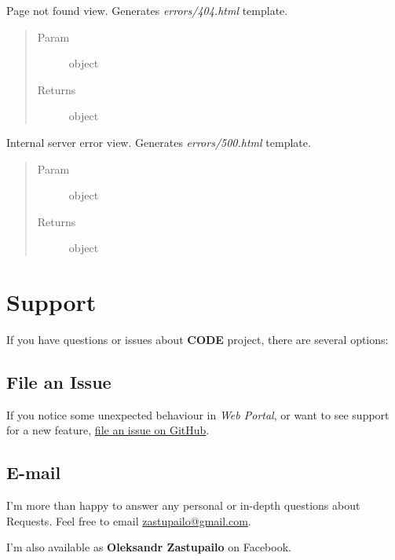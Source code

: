 \documentclass[letterpaper,10pt,english]{sphinxmanual}
\begin{document}
\begin{fulllineitems}
\label{web_portal:core.errors.views.page_not_found}
Page not found view. Generates \emph{errors/404.html} template.
\begin{quote}\begin{description}
\item[{Param}] \leavevmode
{} object

\item[{Returns}] \leavevmode
{} object

\end{description}\end{quote}

\end{fulllineitems}


\begin{fulllineitems}
\label{web_portal:core.errors.views.server_error}
Internal server error view. Generates \emph{errors/500.html} template.
\begin{quote}\begin{description}
\item[{Param}] \leavevmode
{} object

\item[{Returns}] \leavevmode
{} object

\end{description}\end{quote}

\end{fulllineitems}



\section{Support}
\label{support:support}\label{support::doc}
If you have questions or issues about \textbf{CODE} project, there are several options:


\subsection{File an Issue}
\label{support:file-an-issue}
If you notice some unexpected behaviour in \emph{Web Portal}, or want to see support
for a new feature,
\href{https://github.com/azastupailo/Code-Project/issues}{file an issue on GitHub}.


\subsection{E-mail}
\label{support:e-mail}
I'm more than happy to answer any personal or in-depth questions about
Requests. Feel free to email
\href{mailto:zastupailo@gmail.com}{zastupailo@gmail.com}.

I'm also available as \textbf{Oleksandr Zastupailo} on Facebook.



\renewcommand{\indexname}{Index}
\printindex
\end{document}
